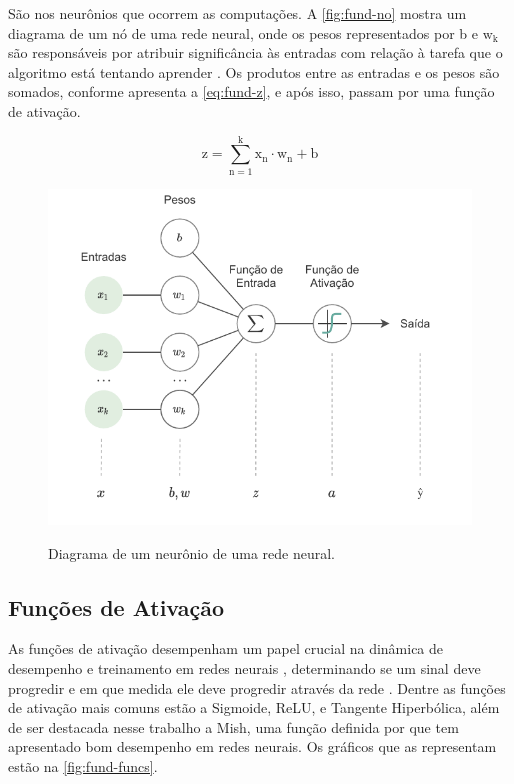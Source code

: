 São nos neurônios que ocorrem as computações. A \autoref{fig:fund-no} mostra um diagrama de um nó de uma rede neural, onde os pesos representados por b e $\mathrm{w_k}$ são responsáveis por atribuir significância às entradas com relação à tarefa que o algoritmo está tentando aprender \cite{ref:Nicholson}. Os produtos entre as entradas e os pesos são somados, conforme apresenta a \autoref{eq:fund-z}, e após isso, passam por uma função de ativação.

\begin{equation} \label{eq:fund-z}
\mathrm{
  z = \sum_{n = 1}^{k} x_n \cdot w_n + b
}
\end{equation}

\begin{figure}[H] %
  \centering
  \caption{Diagrama de um neurônio de uma rede neural.}
  \includegraphics[scale=1.1]{img/img-fundamentacao-no.pdf}
  \label{fig:fund-no}
\end{figure}

\subsection{Funções de Ativação} \label{cap:fund-ia-rn-func}
As funções de ativação desempenham um papel crucial na dinâmica de desempenho e treinamento em redes neurais \cite{ref:Misra}, determinando se um sinal deve progredir e em que medida ele deve progredir através da rede \cite{ref:Nicholson}. Dentre as funções de ativação mais comuns estão a Sigmoide, ReLU, e Tangente Hiperbólica, além de ser destacada nesse trabalho a Mish, uma função definida por  que tem apresentado bom desempenho em redes neurais. Os gráficos que as representam estão na \autoref{fig:fund-funcs}.


